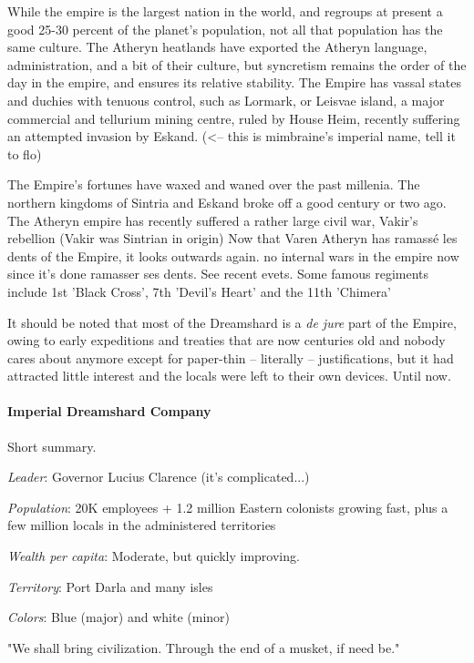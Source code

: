 While the empire is the largest nation in the world, and regroups at present a good 25-30 percent of the planet's population, not all that population has the same culture. The Atheryn heatlands have exported the Atheryn language, administration, and a bit of their culture, but syncretism remains the order of the day in the empire, and ensures its relative stability. The Empire has vassal states and duchies with tenuous control, such as Lormark, or Leisvae island, a major commercial and tellurium mining centre, ruled by House Heim, recently suffering an attempted invasion by Eskand. (<-- this is mimbraine's imperial name, tell it to flo)


The Empire's fortunes have waxed and waned over the past millenia. The northern kingdoms of Sintria and Eskand broke off a good century or two ago. The Atheryn empire has recently suffered a rather large civil war, Vakir's rebellion (Vakir was Sintrian in origin) Now that Varen Atheryn has ramassé les dents of the Empire, it looks outwards again.  no internal wars in the empire now since it's done ramasser ses dents. See recent evets. Some famous regiments include 1st 'Black Cross', 7th 'Devil's Heart' and the 11th 'Chimera'

It should be noted that most of the Dreamshard is a \textit{de jure} part of the Empire, owing to early expeditions and treaties that are now centuries old and nobody cares about anymore except for paper-thin -- literally -- justifications, but it had attracted little interest and the locals were left to their own devices. Until now.



\paragraph{Imperial Dreamshard Company}

Short summary.

\textit{Leader}: Governor Lucius Clarence (it's complicated...)

\textit{Population}: 20K employees + 1.2 million Eastern colonists growing fast, plus a few million locals in the administered territories

\textit{Wealth per capita}: Moderate, but quickly improving.

\textit{Territory}: Port Darla and many isles

\textit{Colors}: Blue (major) and white (minor)


\begin{rpg-quotebox}
    "We shall bring civilization. Through the end of a musket, if need be."
    \end{rpg-quotebox}
    



